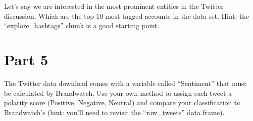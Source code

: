 \documentclass[
]{article}
\begin{document}
Let's say we are interested in the most prominent entities in the
Twitter discussion. Which are the top 10 most tagged accounts in the
data set. Hint: the ``explore\_hashtags'' chunk is a good starting
point.

\newpage

\hypertarget{part-5}{%
\section{Part 5}\label{part-5}}

The Twitter data download comes with a variable called ``Sentiment''
that must be calculated by Brandwatch. Use your own method to assign
each tweet a polarity score (Positive, Negative, Neutral) and compare
your classification to Brandwatch's (hint: you'll need to revisit the
``raw\_tweets'' data frame).
\end{document}
